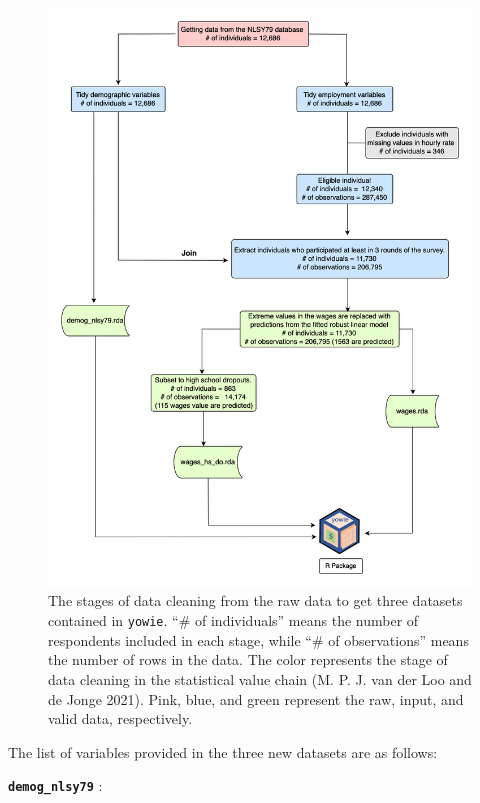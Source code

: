 \documentclass[12pt]{article}
\begin{document}
\begin{figure}

{\centering \includegraphics[width=0.85\linewidth]{../figures/flowchart} 

}

\caption{The stages of data cleaning from the raw data to get three datasets contained in \texttt{yowie}. ``\# of individuals'' means the number of respondents included in each stage, while ``\# of observations'' means the number of rows in the data. The color represents the stage of data cleaning in the statistical value chain (M. P. J. van der Loo and de Jonge 2021). Pink, blue, and green represent the raw, input, and valid data, respectively.}\label{fig:flow-chart}
\end{figure}

The list of variables provided in the three new datasets are as follows:

\textbf{\texttt{demog\_nlsy79}} :
\end{document}
